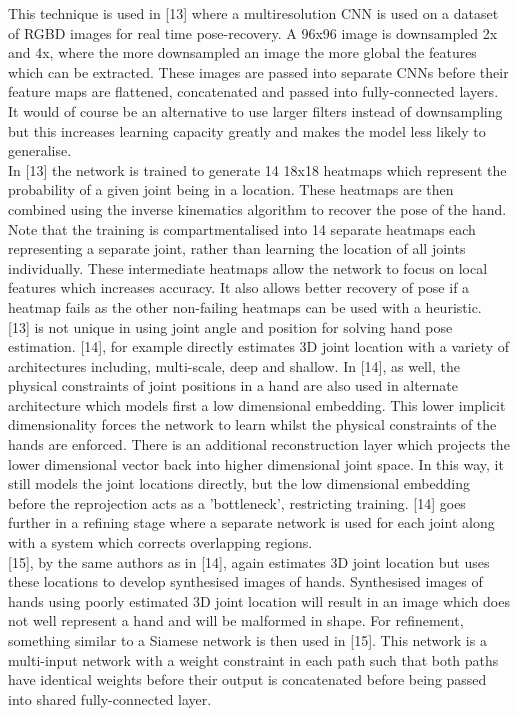 \documentclass{article}
\begin{document}
This technique is used in [13] where a multiresolution CNN is used on a dataset of RGBD images for real time pose-recovery. A 96x96 image is downsampled 2x and 4x, where the more downsampled an image the more global the features which can be extracted. These images are passed into separate CNNs before their feature maps are flattened, concatenated and passed into fully-connected layers. It would of course be an alternative to use larger filters instead of downsampling but this increases learning capacity greatly and makes the model less likely to generalise.\\

In [13] the network is trained to generate 14 18x18 heatmaps which represent the probability of a given joint being in a location. These heatmaps are then combined using the inverse kinematics algorithm to recover the pose of the hand. Note that the training is compartmentalised into 14 separate heatmaps each representing a separate joint, rather than learning the location of all joints individually. These intermediate heatmaps allow the network to focus on local features which increases accuracy. It also allows better recovery of pose if a heatmap fails as the other non-failing heatmaps can be used with a heuristic.\\

[13] is not unique in using joint angle and position for solving hand pose estimation. [14], for example directly estimates 3D joint location with a variety of architectures including, multi-scale, deep and shallow. In [14], as well, the physical constraints of joint positions in a hand are also used in alternate architecture which models first a low dimensional embedding. This lower implicit dimensionality forces the network to learn whilst the physical constraints of the hands are enforced. There is an additional reconstruction layer which projects the lower dimensional vector back into higher dimensional joint space. In this way, it still models the joint locations directly, but the low dimensional embedding before the reprojection acts as a 'bottleneck', restricting training. [14] goes further in a refining stage where a separate network is used for each joint along with a system which corrects overlapping regions.\\

[15], by the same authors as in [14], again estimates 3D joint location but uses these locations to develop synthesised images of hands. Synthesised images of hands using poorly estimated 3D joint location will result in an image which does not well represent a hand and will be malformed in shape. For refinement, something similar to a Siamese network is then used in [15]. This network is a multi-input network with a weight constraint in each path such that both paths have identical weights before their output is concatenated before being passed into shared fully-connected layer.\\
\end{document}

